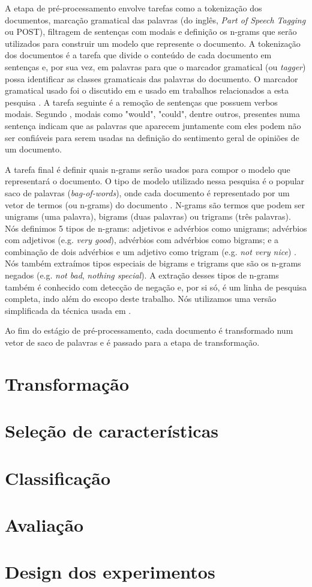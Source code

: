 A etapa de pré-processamento envolve tarefas como a tokenização dos documentos, marcação gramatical das palavras (do inglês, \textit{Part of Speech Tagging} ou POST), filtragem de sentenças com modais e definição os n-grams que serão utilizados para construir um modelo que represente o documento. A tokenização dos documentos é a tarefa que divide o conteúdo de cada documento em sentenças e, por sua vez, em palavras para que o marcador gramatical (ou \textit{tagger}) possa identificar as classes gramaticais das palavras do documento. O marcador gramatical usado foi o discutido em \cite{brill1995transformation} e usado em trabalhos relacionados a esta pesquisa \cite{chaovalit2005movie, taboada2008extracting, taboada2011lexicon}. A tarefa seguinte é a remoção de sentenças que possuem verbos modais. Segundo \cite{taboada2011lexicon}, modais como "would", "could", dentre outros, presentes numa sentença indicam que as palavras que aparecem juntamente com eles podem não ser confiáveis para serem usadas na definição do sentimento geral de opiniões de um documento. 

A tarefa final é definir quais n-grams serão usados para compor o modelo que representará o documento. O tipo de modelo utilizado nessa pesquisa é o popular saco de palavras (\textit{bag-of-words}), onde cada documento é representado por um vetor de termos (ou n-grams) do documento \cite{moraes2012document}. N-grams são termos que podem ser unigrams (uma palavra), bigrams (duas palavras) ou trigrams (três palavras). Nós definimos 5 tipos de n-grams: adjetivos e advérbios como unigrams; advérbios com adjetivos (e.g. \textit{very good}), advérbios com advérbios como bigrams; e a combinação de dois advérbios e um adjetivo como trigram (e.g. \textit{not very nice}) \cite{pang2002thumbs, turney2002thumbs, taboada2008extracting, karamibekr2012verb}. Nós também extraímos tipos especiais de bigrams e trigrams que são os n-grams negados (e.g. \textit{not bad}, \textit{nothing special}). A extração desses tipos de n-grams também é conhecido com detecção de negação e, por si só, é um linha de pesquisa completa, indo além do escopo deste trabalho. Nós utilizamos uma versão simplificada da técnica usada em \cite{taboada2011lexicon}. 

Ao fim do estágio de pré-processamento, cada documento é transformado num vetor de saco de palavras e é passado para a etapa de transformação. 

\section{Transformação}

\section{Seleção de características}

\section{Classificação}

\section{Avaliação}

\section{Design dos experimentos}